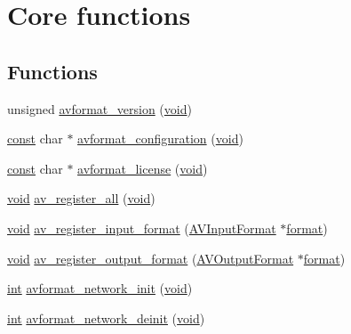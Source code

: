 \hypertarget{group__lavf__core}{}\section{Core functions}
\label{group__lavf__core}
\subsection*{Functions}
\begin{DoxyCompactItemize}
\item 
unsigned \hyperlink{group__lavf__core_gaf2d4e0fee66cef99dea2153933e6b907}{avformat\+\_\+version} (\hyperlink{sound_8c_ae35f5844602719cf66324f4de2a658b3}{void})
\item 
\hyperlink{getopt1_8c_a2c212835823e3c54a8ab6d95c652660e}{const} char $\ast$ \hyperlink{group__lavf__core_ga5f48b0398d77d8eeb45d6c649e4e3404}{avformat\+\_\+configuration} (\hyperlink{sound_8c_ae35f5844602719cf66324f4de2a658b3}{void})
\item 
\hyperlink{getopt1_8c_a2c212835823e3c54a8ab6d95c652660e}{const} char $\ast$ \hyperlink{group__lavf__core_ga160fef784175409f945c70e8931accc8}{avformat\+\_\+license} (\hyperlink{sound_8c_ae35f5844602719cf66324f4de2a658b3}{void})
\item 
\hyperlink{sound_8c_ae35f5844602719cf66324f4de2a658b3}{void} \hyperlink{group__lavf__core_ga917265caec45ef5a0646356ed1a507e3}{av\+\_\+register\+\_\+all} (\hyperlink{sound_8c_ae35f5844602719cf66324f4de2a658b3}{void})
\item 
\hyperlink{sound_8c_ae35f5844602719cf66324f4de2a658b3}{void} \hyperlink{group__lavf__core_ga896f319308627b5b66fd41a4b1d53ae6}{av\+\_\+register\+\_\+input\+\_\+format} (\hyperlink{struct_a_v_input_format}{A\+V\+Input\+Format} $\ast$\hyperlink{_export_p_c_m_8cpp_a317afff57d87a89158c2b038d37b2b08}{format})
\item 
\hyperlink{sound_8c_ae35f5844602719cf66324f4de2a658b3}{void} \hyperlink{group__lavf__core_gabf0629358bc40c7874932ef6f4dda6b8}{av\+\_\+register\+\_\+output\+\_\+format} (\hyperlink{struct_a_v_output_format}{A\+V\+Output\+Format} $\ast$\hyperlink{_export_p_c_m_8cpp_a317afff57d87a89158c2b038d37b2b08}{format})
\item 
\hyperlink{xmltok_8h_a5a0d4a5641ce434f1d23533f2b2e6653}{int} \hyperlink{group__lavf__core_ga84542023693d61e8564c5d457979c932}{avformat\+\_\+network\+\_\+init} (\hyperlink{sound_8c_ae35f5844602719cf66324f4de2a658b3}{void})
\item 
\hyperlink{xmltok_8h_a5a0d4a5641ce434f1d23533f2b2e6653}{int} \hyperlink{group__lavf__core_ga245f2875f80ce67ec3d1e0f54dacf2c4}{avformat\+\_\+network\+\_\+deinit} (\hyperlink{sound_8c_ae35f5844602719cf66324f4de2a658b3}{void})

\end{DoxyCompactItemize}
